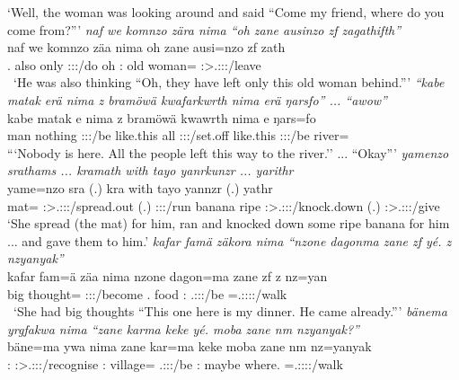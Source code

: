 \begin{exe}
	\trans `Well, the woman was looking around and said ``Come my friend, where do you come from?'''
	\emph{naf we komnzo zära nima ``oh zane ausinzo zf zagathifth''}\\
	\gll naf we komnzo zäa nima oh zane ausi=nzo zf zath\\
	\Tsg.\Erg{} also only \Stsg:\Sbj:\Pst:\Pfv/do \Quot{} oh \Dem:\Prox{} {old woman}=\Only{} \Imm{} \Stpl:\Sbj>\Tsg.\F:\Obj:\Rpst:\Pfv/leave\\\
	\trans `He was also thinking ``Oh, they have left only this old woman behind.'''
\exi{36}
	\emph{``kabe matak erä nima z bramöwä kwafarkwrth nima erä ŋarsfo'' ... ``awow''}\\
	\gll kabe matak e nima z bramöwä kwa\stem{fark}wrth nima e\stem{rä} ŋars=fo\\
	man nothing \Stpl:\Sbj:\Nonpast:\Ipfv/be {like.this} \Iam{} all \Stpl:\Sbj:\Pst:\Ipfv/set.off {like.this} \Stpl:\Sbj:\Nonpast:\Ipfv/be river=\All\\
	\trans ```Nobody is here. All the people left this way to the river.'' ... ``Okay'''
\exi{39}
	\emph{yamenzo srathams ... kramath with tayo yanrkunzr ... yarithr}\\
	\gll yame=nzo sra\stem{thams} (.) kra\stem{math} with tayo yannzr (.) yathr\\
	mat=\Only{} \Stsg:\Sbj>\Tsg.\Masc:\Io:\Irr:\Pfv/spread.out (.) \Stsg:\Sbj:\Irr:\Pfv/run banana ripe \Stsg:\Sbj>\Tsg.\Masc:\Io:\Nonpast:\Ipfv/knock.down (.) \Stsg:\Sbj>\Tsg.\Masc:\Io:\Nonpast:\Ipfv/give\\
	\trans `She spread (the mat) for him, ran and knocked down some ripe banana for him ... and gave them to him.'
\exi{40}
	\emph{kafar famä zäkora nima ``nzone dagonma zane zf yé. z nzyanyak''}\\
	\gll kafar fam=ä zä\stem{kor}a nima nzone dagon=ma zane zf \stem{yé} z nz=yan\\
	big thought=\Assoc{} \Stsg:\Sbj:\Pst:\Pfv/become \Quot{} \Fsg.\Poss{} food \Dem:\Prox{} \Imm{} \Tsg.\Masc:\Sbj:\Nonpast:\Ipfv/be \Iam{} \Immpst=\Tsg.\Masc:\Sbj:\Nonpast:\Ipfv:\Venit/walk\\\
	\trans `She had big thoughts ``This one here is my dinner. He came already.'''
\exi{40}
	\emph{bänema yrgfakwa nima ``zane karma keke yé. moba zane nm nzyanyak?''}\\
	\gll bäne=ma ywa nima zane kar=ma keke  moba zane nm nz=yanyak\\
	\Dem:\Med{} \Stsg:\Sbj>\Tsg.\Masc:\Obj:\Pst:\Ipfv/recognise \Quot{} \Dem:\Prox{} village=\Char{} \Neg{} \Tsg.\Masc:\Sbj:\Nonpast:\Ipfv/be \Dem:\Prox{} maybe where.\Abl{} \Immpst=\Tsg.\Masc:\Sbj:\Nonpast:\Ipfv:\Venit/walk\\

\end{exe}
